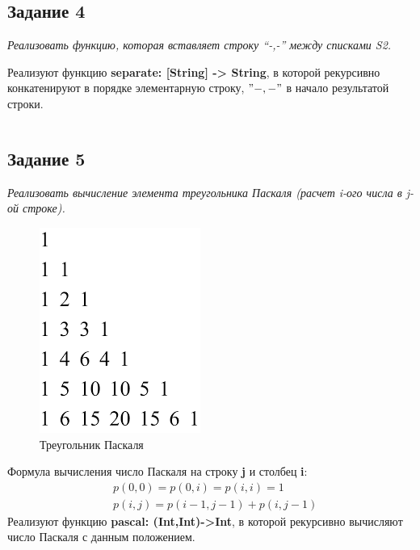 \documentclass[12pt]{article} %
\begin{document}
\inputminted[firstline = 36, lastline = 38, frame= single]{Haskell}{F:/git/FuncProg/Assignment1/Assign1.hs}

\subsection{Задание 4}

\textit{
Реализовать функцию, которая вставляет строку “-,-” между списками S2. 
}

Реализуют функцию \textbf{separate: [String] -> String}, в которой рекурсивно конкатенируют в порядке элементарную строку, $"-,-"$ в начало результатой строки. 

\inputminted[firstline = 41, lastline = 43, frame= single]{Haskell}{F:/git/FuncProg/Assignment1/Assign1.hs}

\newpage
\subsection{Задание 5}

\textit{
Реализовать вычисление элемента треугольника Паскаля (расчет i-ого числа в j-ой строке).
}
\begin{figure}[H]
\centering\includegraphics{pascal.png}
\caption{Треугольник Паскаля}
\end{figure}
Формула вычисления число Паскаля на строку \textbf{j} и столбец \textbf{i}:
\[ \begin{align}& p(0,0) = p (0,i) = p (i,i) = 1 \\
 & p(i,j) = p(i-1,j-1) + p(i,j -1)\end{align}\]
Реализуют функцию \textbf{pascal: (Int,Int)->Int}, в которой рекурсивно вычисляют число Паскаля с данным положением. 

\newpage
\inputminted[firstline = 48, lastline = 53, frame= single]{Haskell}{F:/git/FuncProg/Assignment1/Assign1.hs}
\end{document}

